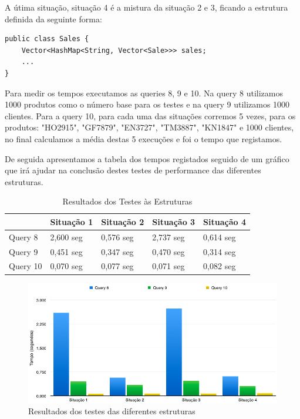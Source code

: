 \documentclass[10pt] {article}
\begin{document}
\par A útima situação, situação 4 é a mistura da situação 2 e 3, ficando a estrutura definida da seguinte forma:

\begin{lstlisting}
public class Sales {
	Vector<HashMap<String, Vector<Sale>>> sales;
	...
}
\end{lstlisting}

\par Para medir os tempos executamos as queries 8, 9 e 10. Na query 8 utilizamos 1000 produtos como o número base
para os testes e na query 9 utilizamos 1000 clientes. Para a query 10, para cada uma das situações corremos 5 vezes,
para os produtos: "HO2915", "GF7879", "EN3727", "TM3887", "KN1847" e 1000 clientes, no final calculamos a média destas 5
execuções e foi o tempo que registamos.
\par De seguida apresentamos a tabela dos tempos registados seguido de um gráfico que irá ajudar na conclusão destes
testes de performance das diferentes estruturas.

\newpage

\begin{table}[h]
\centering
\caption{Resultados dos Testes às Estruturas}
\begin{tabular}{l|l|l|l|l|}
\cline{2-5}
                               & Situação 1 & Situação 2 & Situação 3 & Situação 4 \\ \hline
\multicolumn{1}{|l|}{Query 8}  & 2,600 seg  & 0,576 seg  & 2,737 seg  & 0,614 seg  \\ \hline
\multicolumn{1}{|l|}{Query 9}  & 0,451 seg  & 0,347 seg  & 0,470 seg  & 0,314 seg  \\ \hline
\multicolumn{1}{|l|}{Query 10} & 0,070 seg  & 0,077 seg  & 0,071 seg  & 0,082 seg  \\ \hline
\end{tabular}
\end{table}

\begin{figure}[ht!]
\centering
\includegraphics[width=150mm]{graphstruct.png}
\caption{Resultados dos testes das diferentes estruturas}
\label{fig:sales}
\end{figure}
\end{document}
